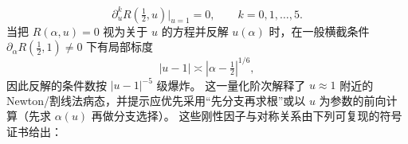 \begin{remark}[消元曲线的对偶对称、端点奇异簇与 \texorpdfstring{$\alpha=\tfrac12$}{alpha=1/2} 聚合指纹]
\[
\partial_u^k R\!\left(\tfrac12,u\right)\Big|_{u=1}=0,\qquad k=0,1,\dots,5.
\]
当把 \(R(\alpha,u)=0\) 视为关于 \(u\) 的方程并反解 \(u(\alpha)\) 时，在一般横截条件 \(\partial_\alpha R(\tfrac12,1)\neq0\) 下有局部标度
\[
|u-1|\asymp|\alpha-\tfrac12|^{1/6},
\]
因此反解的条件数按 \(|u-1|^{-5}\) 级爆炸。
这一量化阶次解释了 \(u\approx1\) 附近的 Newton/割线法病态，并提示应优先采用“先分支再求根”或以 \(u\) 为参数的前向计算（先求 \(\alpha(u)\) 再做分支选择）。
这些刚性因子与对称关系由下列可复现的符号证书给出：

\end{remark}





